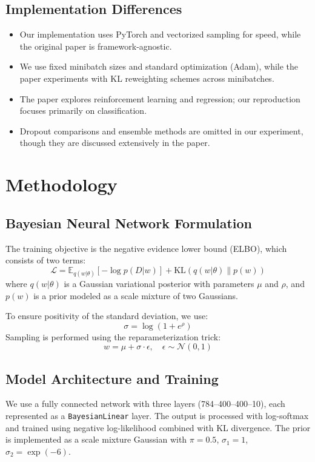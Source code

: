 \documentclass{article}
\begin{document}
\subsection*{Implementation Differences}
\begin{itemize}
  \item Our implementation uses PyTorch and vectorized sampling for speed, while the original paper is framework-agnostic.
  \item We use fixed minibatch sizes and standard optimization (Adam), while the paper experiments with KL reweighting schemes across minibatches.
  \item The paper explores reinforcement learning and regression; our reproduction focuses primarily on classification.
  \item Dropout comparisons and ensemble methods are omitted in our experiment, though they are discussed extensively in the paper.
\end{itemize}


\section{Methodology}

\subsection{Bayesian Neural Network Formulation}

The training objective is the negative evidence lower bound (ELBO), which consists of two terms:
\[
\mathcal{L} = \mathbb{E}_{q(w|\theta)} [-\log p(D|w)] + \mathrm{KL}(q(w|\theta) \| p(w))
\]
where $q(w|\theta)$ is a Gaussian variational posterior with parameters $\mu$ and $\rho$, and $p(w)$ is a prior modeled as a scale mixture of two Gaussians.

To ensure positivity of the standard deviation, we use:
\[
\sigma = \log(1 + e^{\rho})
\]
Sampling is performed using the reparameterization trick:
\[
w = \mu + \sigma \cdot \epsilon, \quad \epsilon \sim \mathcal{N}(0, 1)
\]


\subsection{Model Architecture and Training}

We use a fully connected network with three layers (784--400--400--10), each represented as a \texttt{BayesianLinear} layer. The output is processed with log-softmax and trained using negative log-likelihood combined with KL divergence. The prior is implemented as a scale mixture Gaussian with $\pi = 0.5$, $\sigma_1 = 1$, $\sigma_2 = \exp(-6)$.
\end{document}

